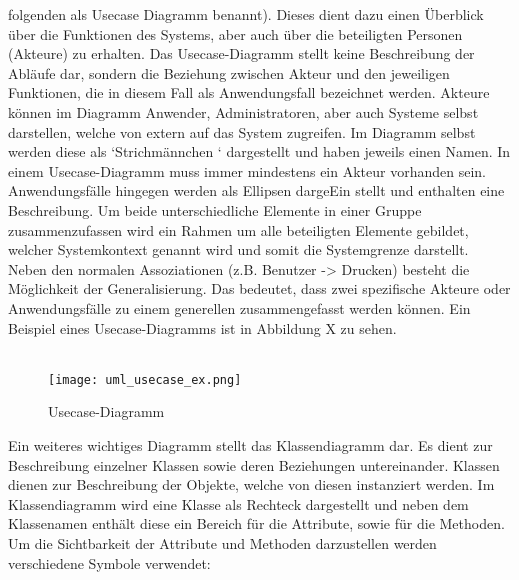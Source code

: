 folgenden als Usecase Diagramm benannt).  Dieses dient dazu einen Überblick über die Funktionen des Systems, aber auch über die beteiligten Personen (Akteure) zu erhalten. Das Usecase-Diagramm stellt keine Beschreibung der Abläufe dar, sondern die Beziehung zwischen Akteur und den jeweiligen Funktionen, die in diesem Fall als Anwendungsfall bezeichnet werden. Akteure können im Diagramm Anwender, Administratoren, aber auch Systeme selbst darstellen, welche von extern auf das System zugreifen. Im Diagramm selbst werden diese als ‘Strichmännchen ‘ dargestellt und haben jeweils einen Namen. In einem Usecase-Diagramm muss immer mindestens ein Akteur vorhanden sein.
Anwendungsfälle hingegen werden als Ellipsen dargeEin stellt und enthalten eine Beschreibung. Um beide unterschiedliche Elemente in einer Gruppe zusammenzufassen wird ein Rahmen um alle beteiligten Elemente gebildet, welcher Systemkontext genannt wird und somit die Systemgrenze darstellt. Neben den normalen Assoziationen (z.B. Benutzer -> Drucken) besteht die Möglichkeit der Generalisierung. Das bedeutet, dass zwei spezifische Akteure oder Anwendungsfälle zu einem generellen zusammengefasst werden können.
Ein Beispiel eines Usecase-Diagramms ist in Abbildung X zu sehen.\\
\\
\begin{figure}[H]
\centering
\texttt{[image: uml\_usecase\_ex.png]}
\caption{Usecase-Diagramm}
\label{fig:show_s1_s2_p1_n1}
\end{figure}
Ein weiteres wichtiges Diagramm stellt das Klassendiagramm dar. Es dient zur Beschreibung einzelner Klassen sowie deren Beziehungen untereinander. Klassen dienen zur Beschreibung der Objekte, welche von diesen instanziert werden. Im Klassendiagramm wird eine Klasse als Rechteck dargestellt und neben dem Klassenamen enthält diese ein Bereich für die Attribute, sowie für die Methoden. Um die Sichtbarkeit der Attribute und Methoden darzustellen werden verschiedene Symbole verwendet:\\

